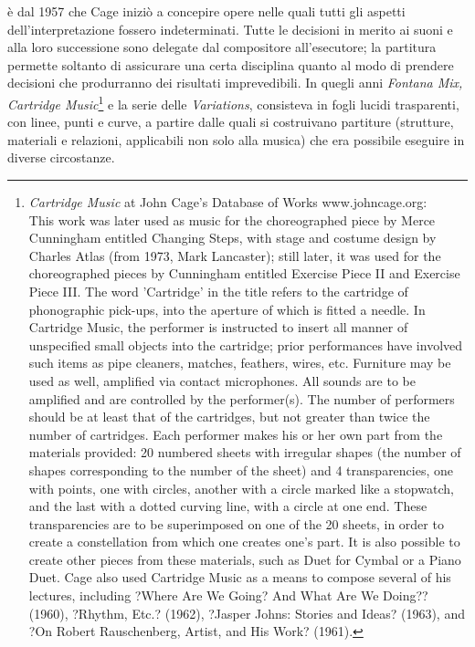 \begin{multicols}{2}
\`e dal 1957 che Cage inizi\`o a concepire opere nelle quali tutti gli aspetti
dell'interpretazione fossero indeterminati. Tutte le decisioni in merito ai
suoni e alla loro successione sono delegate dal compositore all'esecutore;
la partitura permette soltanto di assicurare una certa disciplina quanto al
modo di prendere decisioni che produrranno dei risultati imprevedibili. In quegli
anni \emph{Fontana Mix, Cartridge Music}\footnote{\emph{Cartridge
Music} at John Cage's Database of Works www.johncage.org: \\ This work was later used as music for the choreographed piece by Merce Cunningham
entitled Changing Steps, with stage and costume design by Charles Atlas (from 1973,
Mark Lancaster); still later, it was used for the choreographed pieces by
Cunningham entitled Exercise Piece II and Exercise Piece III.
The word 'Cartridge' in the title refers to the cartridge of phonographic
pick-ups, into the aperture of which is fitted a needle. In Cartridge Music,
the performer is instructed to insert all manner of unspecified small objects
into the cartridge; prior performances have involved such items as pipe cleaners,
matches, feathers, wires, etc. Furniture may be used as well, amplified via
contact microphones. All sounds are to be amplified and are controlled by the
performer(s). The number of performers should be at least that of the cartridges,
but not greater than twice the number of cartridges. Each performer makes his or
her own part from the materials provided: 20 numbered sheets with irregular
shapes (the number of shapes corresponding to the number of the sheet) and 4
transparencies, one with points, one with circles, another with a circle marked
like a stopwatch, and the last with a dotted curving line, with a circle at one
end. These transparencies are to be superimposed on one of the 20 sheets, in
order to create a constellation from which one creates one's part. It is also
possible to create other pieces from these materials, such as Duet for Cymbal
or a Piano Duet. Cage also used Cartridge Music as a means to compose several
of his lectures, including ?Where Are We Going? And What Are We Doing?? (1960),
?Rhythm, Etc.? (1962), ?Jasper Johns: Stories and Ideas? (1963), and
?On Robert Rauschenberg, Artist, and His Work? (1961).} e la serie delle \emph{Variations},
consisteva in fogli lucidi trasparenti, con linee, punti e curve, a partire dalle
quali si costruivano partiture (strutture, materiali e relazioni, applicabili non
solo alla musica) che era possibile eseguire in diverse circostanze.


\end{multicols}
